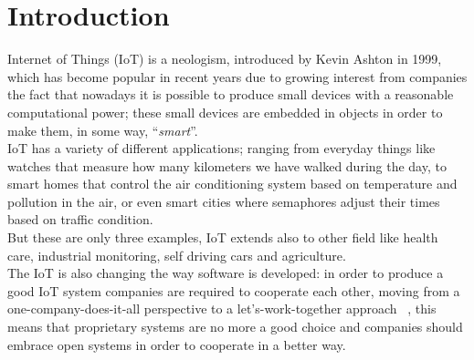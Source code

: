 	\chapter{Introduction}
	Internet of Things (IoT) is a neologism, introduced by Kevin Ashton in 1999, which has become popular in recent years due to
	growing interest from companies the fact that nowadays it is possible to produce small devices with a reasonable computational power;
	these small devices are embedded in objects in order to make them, in some way, ``\emph{smart}''.\\
	
	IoT has a variety of different applications; ranging from everyday things like watches that measure how many kilometers we have walked during the day, to smart homes that control the air conditioning system based on temperature and pollution in the air, or even smart cities where semaphores adjust their times based on traffic condition.\\
	But these are only three examples, IoT extends also to other field like health care, industrial monitoring, self driving cars and agriculture.\\
	
	The IoT is also changing the way software is developed: in order to produce a good IoT system companies are required to cooperate each other,
	moving from a one-company-does-it-all perspective to a let’s-work-together approach ~\cite{successiot}, this means that proprietary systems 
	are no more a good choice and companies should embrace open systems in order to cooperate in a better way.\\
	

